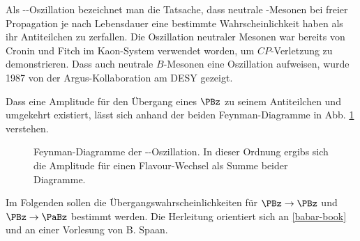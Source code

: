 Als \PB-\PaB-Oszillation bezeichnet man die Tatsache, dass neutrale \PB-Mesonen bei freier Propagation je nach Lebensdauer eine bestimmte Wahrscheinlichkeit haben als ihr Antiteilchen zu zerfallen.
Die Oszillation neutraler Mesonen war bereits von Cronin und Fitch im Kaon-System verwendet worden, um $CP$-Verletzung zu demonstrieren\cite{kaons-cronin-fitch}.
Dass auch neutrale $B$-Mesonen eine Oszillation aufweisen, wurde 1987 von der Argus-Kollaboration am DESY gezeigt\cite{argus-bbar}.

Dass eine Amplitude für den Übergang eines $\PBz$ zu seinem Antiteilchen und umgekehrt existiert, lässt sich anhand der beiden Feynman-Diagramme in Abb. \ref{bbar-oscillation} verstehen.

\begin{figure}
  \hspace{1cm}
  \label{bbar-oscillation}
  \caption{Feynman-Diagramme der \PBz-\PaBz-Oszillation. In dieser Ordnung ergibs sich die Amplitude für einen Flavour-Wechsel als Summe beider Diagramme.}
\end{figure}

Im Folgenden sollen die Übergangswahrscheinlichkeiten für $\PBz \to \PBz$ und $\PBz \to \PaBz$ bestimmt werden.
Die Herleitung orientiert sich an \ref{babar-book} und an einer Vorlesung von B. Spaan.


